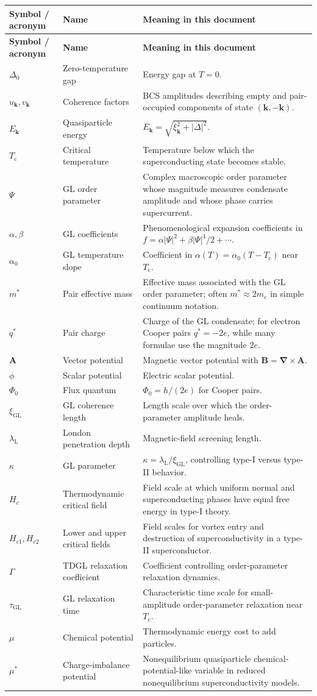 \documentclass[11pt]{article}
\numberwithin{equation}{section}
\newenvironment{symtable}{\rowcolors{2}{SoftGray}{white}\begin{longtable}{>{\RaggedRight\arraybackslash}p{0.18\textwidth} >{\RaggedRight\arraybackslash}p{0.25\textwidth} >{\RaggedRight\arraybackslash}p{0.47\textwidth}}\toprule \textbf{Symbol / acronym} & \textbf{Name} & \textbf{Meaning in this document} \\ \midrule\endfirsthead\toprule \textbf{Symbol / acronym} & \textbf{Name} & \textbf{Meaning in this document} \\ \midrule\endhead}{\bottomrule\end{longtable}}
\newcommand{\kvec}{\bm{k}}
\newcommand{\Avec}{\bm{A}}
\newcommand{\Bvec}{\bm{B}}
\renewcommand{\grad}{\bm{\nabla}}
\newcommand{\Tc}{T_{\mathrm{c}}}
\newcommand{\xiGL}{\xi_{\mathrm{GL}}}
\newcommand{\lambdaL}{\lambda_{\mathrm{L}}}
\newcommand{\Phizero}{\Phi_0}
\newcommand{\Deltaz}{\Delta_0}
\newcommand{\Ord}{\Psi}
\newcommand{\GammaTD}{\Gamma}
\begin{document}
\begin{symtable}
$\Deltaz$ & Zero-temperature gap & Energy gap at $T=0$. \\
$u_{\kvec},v_{\kvec}$ & Coherence factors & BCS amplitudes describing empty and pair-occupied components of state $(\kvec,-\kvec)$. \\
$E_{\kvec}$ & Quasiparticle energy & $E_{\kvec}=\sqrt{\xi_{\kvec}^2+|\Delta|^2}$. \\
$\Tc$ & Critical temperature & Temperature below which the superconducting state becomes stable. \\
$\Ord$ & GL order parameter & Complex macroscopic order parameter whose magnitude measures condensate amplitude and whose phase carries supercurrent. \\
$\alpha,\beta$ & GL coefficients & Phenomenological expansion coefficients in $f=\alpha |\Ord|^2+\beta |\Ord|^4/2+\cdots$. \\
$\alpha_0$ & GL temperature slope & Coefficient in $\alpha(T)=\alpha_0(T-\Tc)$ near $\Tc$. \\
$m^*$ & Pair effective mass & Effective mass associated with the GL order parameter; often $m^*\approx 2m_e$ in simple continuum notation. \\
$q^*$ & Pair charge & Charge of the GL condensate; for electron Cooper pairs $q^*=-2e$, while many formulae use the magnitude $2e$. \\
$\Avec$ & Vector potential & Magnetic vector potential with $\Bvec=\grad\times\Avec$. \\
$\phi$ & Scalar potential & Electric scalar potential. \\
$\Phizero$ & Flux quantum & $\Phizero=h/(2e)$ for Cooper pairs. \\
$\xiGL$ & GL coherence length & Length scale over which the order-parameter amplitude heals. \\
$\lambdaL$ & London penetration depth & Magnetic-field screening length. \\
$\kappa$ & GL parameter & $\kappa=\lambdaL/\xiGL$, controlling type-I versus type-II behavior. \\
$H_c$ & Thermodynamic critical field & Field scale at which uniform normal and superconducting phases have equal free energy in type-I theory. \\
$H_{c1},H_{c2}$ & Lower and upper critical fields & Field scales for vortex entry and destruction of superconductivity in a type-II superconductor. \\
$\GammaTD$ & TDGL relaxation coefficient & Coefficient controlling order-parameter relaxation dynamics. \\
$\tau_{\mathrm{GL}}$ & GL relaxation time & Characteristic time scale for small-amplitude order-parameter relaxation near $\Tc$. \\
$\mu$ & Chemical potential & Thermodynamic energy cost to add particles. \\
$\mu^*$ & Charge-imbalance potential & Nonequilibrium quasiparticle chemical-potential-like variable in reduced nonequilibrium superconductivity models. \\
\end{symtable}
\end{document}
